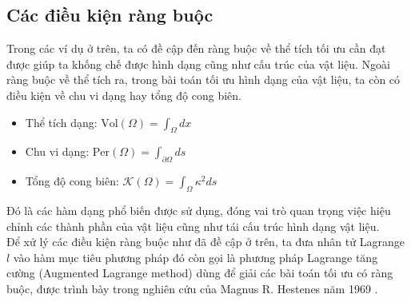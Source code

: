\documentclass[
12pt, %
oneside, %
english, %
onehalfspacing, %
nolistspacing, %
headsepline, %
addchap,
]{MastersDoctoralThesis} %
\begin{document}
\subsection*{Các điều kiện ràng buộc}
Trong các ví dụ ở trên, ta có đề cập đến ràng buộc về thể tích tối ưu cần đạt được giúp ta khống chế được hình dạng cũng như cấu trúc của vật liệu. Ngoài ràng buộc về thể tích ra, trong bài toán tối ưu hình dạng của vật liệu, ta còn có điều kiện về chu vi dạng hay tổng độ cong biên.
\begin{itemize}
\item Thể tích dạng: $\text{Vol}(\Omega)=\int_\Omega dx$
\item Chu vi dạng: $\text{Per}(\Omega)=\int_{\partial\Omega} ds$
\item Tổng độ cong biên: $\mathcal{K}(\Omega)=\int_\Omega\kappa^2ds$
\end{itemize}
Đó là các hàm dạng phổ biến được sử dụng, đóng vai trò quan	 trọng việc hiệu chỉnh các thành phần của vật liệu cũng như tái cấu trúc hình dạng vật liệu.\\
Để xử lý các điều kiện ràng buộc như đã đề cập ở trên, ta đưa nhân tử Lagrange $l$ vào hàm mục tiêu phương pháp đó còn gọi là phương pháp Lagrange tăng cường (Augmented Lagrange method) dùng để giải các bài toán tối ưu có ràng buộc, được trình bày trong nghiên cứu của Magnus R. Hestenes năm 1969 \cite{Hes69}. 
\end{document}
